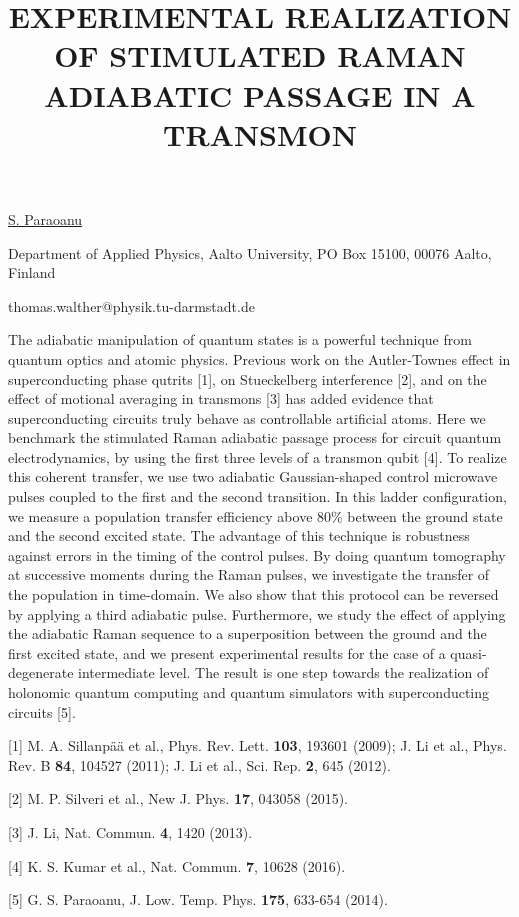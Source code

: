 \title{EXPERIMENTAL REALIZATION OF STIMULATED RAMAN ADIABATIC PASSAGE IN A TRANSMON}

\underline{S. Paraoanu} 

{\normalsize{\vspace{-4mm}
Department of Applied Physics,
Aalto University,
PO Box 15100,
00076 Aalto,
Finland

\email thomas.walther@physik.tu-darmstadt.de}}

The adiabatic manipulation of quantum states is a powerful technique from quantum optics and atomic physics. Previous work on the Autler-Townes effect in superconducting phase qutrits [1], on Stueckelberg interference [2], and on the effect of motional averaging in transmons [3] has added evidence that superconducting circuits truly behave as controllable artificial atoms.
Here we benchmark the stimulated Raman adiabatic passage process for circuit quantum
electrodynamics, by using the first three levels of a transmon qubit [4]. To realize this coherent transfer, we use two adiabatic Gaussian-shaped control microwave pulses coupled
to the first and the second transition. In this ladder configuration, we measure a population transfer efficiency above 80\% between the ground state and the second excited state.  The advantage of this technique is robustness against errors in the timing of the control pulses. By doing quantum tomography at successive moments during the Raman pulses, we investigate the transfer of the
population in time-domain. We also show that this protocol can be reversed by applying
a third adiabatic pulse. Furthermore, we study the effect of applying the adiabatic
Raman sequence to a superposition between the ground and the first excited state,
and we present experimental results for the case of a quasi-degenerate intermediate
level. The result is one step towards the realization of holonomic quantum computing and
quantum simulators with superconducting circuits [5].

{\normalsize
[1] M. A. Sillanp\"{a}\"{a} et al., Phys. Rev. Lett. \textbf{103}, 193601 (2009);
J. Li et al., Phys. Rev. B \textbf{84}, 104527 (2011);
J. Li et al., Sci. Rep. \textbf{2}, 645 (2012).
\vsp

[2] M. P. Silveri et al., New J. Phys. \textbf{17}, 043058 (2015).
\vsp

[3] J. Li, Nat. Commun. \textbf{4}, 1420 (2013).
\vsp

[4] K. S. Kumar et al., Nat. Commun. \textbf{7}, 10628 (2016).
\vsp

[5] G. S. Paraoanu, J. Low. Temp. Phys. \textbf{175}, 633-654 (2014).
}



\vspace{\baselineskip} 